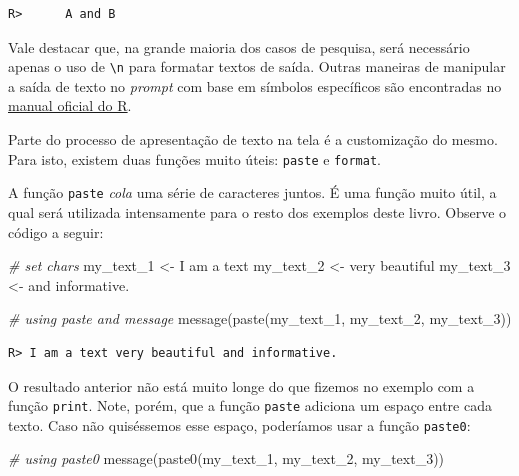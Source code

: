 \documentclass[
  11pt,
]{book}
\newenvironment{Shaded}{\begin{snugshade}}{\end{snugshade}}
\newcommand{\CommentTok}[1]{\textcolor[rgb]{0.37,0.37,0.37}{\textit{#1}}}
\newcommand{\FunctionTok}[1]{\textcolor[rgb]{0,0,0}{#1}}
\newcommand{\NormalTok}[1]{#1}
\newcommand{\OtherTok}[1]{\textcolor[rgb]{0.37,0.37,0.37}{#1}}
\newcommand{\StringTok}[1]{\textcolor[rgb]{0.5,0.5,0.5}{#1}}
\begin{document}
\begin{verbatim}
R>      A and B
\end{verbatim}

Vale destacar que, na grande maioria dos casos de pesquisa, será necessário apenas o uso de \texttt{\textbackslash{}n} para formatar textos de saída. Outras maneiras de manipular a saída de texto no \emph{prompt} com base em símbolos específicos são encontradas no \href{https://cran.r-project.org/doc/manuals/R-lang.html\#Literal-constants}{manual oficial do R}.

Parte do processo de apresentação de texto na tela é a customização do mesmo. Para isto, existem duas funções muito úteis: \texttt{paste} e \texttt{format}.  

A função \texttt{paste} \emph{cola} uma série de caracteres juntos. É uma função muito útil, a qual será utilizada intensamente para o resto dos exemplos deste livro. Observe o código a seguir:

\begin{Shaded}
\begin{Highlighting}[]
\CommentTok{\# set chars}
\NormalTok{my\_text\_1 }\OtherTok{\textless{}{-}} \StringTok{\textquotesingle{}I am a text\textquotesingle{}}
\NormalTok{my\_text\_2 }\OtherTok{\textless{}{-}} \StringTok{\textquotesingle{}very beautiful\textquotesingle{}}
\NormalTok{my\_text\_3 }\OtherTok{\textless{}{-}} \StringTok{\textquotesingle{}and informative.\textquotesingle{}}

\CommentTok{\# using paste and message}
\FunctionTok{message}\NormalTok{(}\FunctionTok{paste}\NormalTok{(my\_text\_1, my\_text\_2, my\_text\_3))}
\end{Highlighting}
\end{Shaded}

\begin{verbatim}
R> I am a text very beautiful and informative.
\end{verbatim}

O resultado anterior não está muito longe do que fizemos no exemplo com a função \texttt{print}. Note, porém, que a função \texttt{paste} adiciona um espaço entre cada texto. Caso não quiséssemos esse espaço, poderíamos usar a função \texttt{paste0}: 

\begin{Shaded}
\begin{Highlighting}[]
\CommentTok{\# using paste0}
\FunctionTok{message}\NormalTok{(}\FunctionTok{paste0}\NormalTok{(my\_text\_1, my\_text\_2, my\_text\_3))}
\end{Highlighting}
\end{Shaded}
\end{document}
